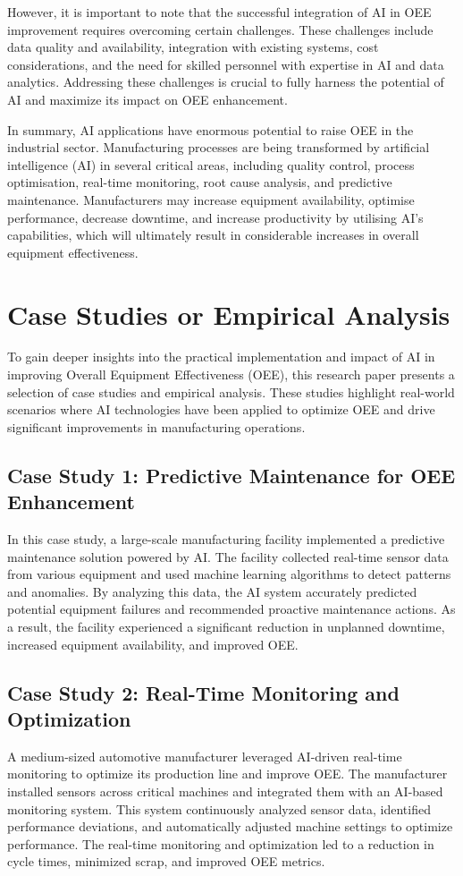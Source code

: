 \documentclass[12pt]{article}
\begin{document}
However, it is important to note that the successful integration of AI in OEE improvement requires overcoming certain challenges. These challenges include data quality and availability, integration with existing systems, cost considerations, and the need for skilled personnel with expertise in AI and data analytics. Addressing these challenges is crucial to fully harness the potential of AI and maximize its impact on OEE enhancement.

In summary, AI applications have enormous potential to raise OEE in the industrial sector. Manufacturing processes are being transformed by artificial intelligence (AI) in several critical areas, including quality control, process optimisation, real-time monitoring, root cause analysis, and predictive maintenance. Manufacturers may increase equipment availability, optimise performance, decrease downtime, and increase productivity by utilising AI's capabilities, which will ultimately result in considerable increases in overall equipment effectiveness.

\section{Case Studies or Empirical Analysis}
To gain deeper insights into the practical implementation and impact of AI in improving Overall Equipment Effectiveness (OEE), this research paper presents a selection of case studies and empirical analysis. These studies highlight real-world scenarios where AI technologies have been applied to optimize OEE and drive significant improvements in manufacturing operations.

\subsection{Case Study 1: Predictive Maintenance for OEE Enhancement}
In this case study, a large-scale manufacturing facility implemented a predictive maintenance solution powered by AI. The facility collected real-time sensor data from various equipment and used machine learning algorithms to detect patterns and anomalies. By analyzing this data, the AI system accurately predicted potential equipment failures and recommended proactive maintenance actions. As a result, the facility experienced a significant reduction in unplanned downtime, increased equipment availability, and improved OEE.

\subsection{Case Study 2: Real-Time Monitoring and Optimization}
A medium-sized automotive manufacturer leveraged AI-driven real-time monitoring to optimize its production line and improve OEE. The manufacturer installed sensors across critical machines and integrated them with an AI-based monitoring system. This system continuously analyzed sensor data, identified performance deviations, and automatically adjusted machine settings to optimize performance. The real-time monitoring and optimization led to a reduction in cycle times, minimized scrap, and improved OEE metrics.
\end{document}
